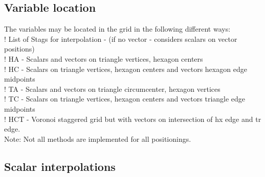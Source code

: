 \documentclass[a4paper,10pt]{article}
\begin{document}
\subsection{Variable location}

The variables may be located in the grid in the following different ways:\\
  ! List of Stags for interpolation - (if no vector - considers scalars on vector positions)\\
  ! HA  - Scalars and vectors on triangle vertices, hexagon centers\\
  ! HC  - Scalars on triangle vertices, hexagon centers and vectors hexagon edge midpoints\\
  ! TA  - Scalars and vectors on triangle circumcenter, hexagon vertices\\
  ! TC  - Scalars on triangle vertices, hexagon centers and vectors triangle edge midpoints\\
  ! HCT - Voronoi staggered grid but with vectors on intersection of hx edge and tr edge.\\
 
Note: Not all methods are implemented for all positionings.

\subsection{Scalar interpolations}
\end{document}
